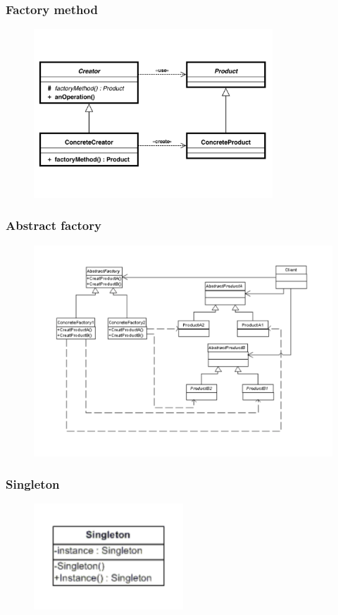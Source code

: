 \documentclass{beamer}
\begin{document}
\begin{frame}
\frametitle{Factory method}
\begin{figure}
\includegraphics[width=0.8\textwidth]{Img/FactoryMethodDescription.pdf}
\end{figure}
\end{frame}

\begin{frame}
\frametitle{Abstract factory}
\begin{figure}
\includegraphics[width=1\textwidth]{Img/AbstractFactoryDescription.pdf}
\end{figure}
\end{frame}

\begin{frame}
\frametitle{Singleton}
\begin{figure}
\includegraphics[width=0.5\textwidth]{Img/Singleton.pdf}
\end{figure}
\end{frame}
\end{document}
